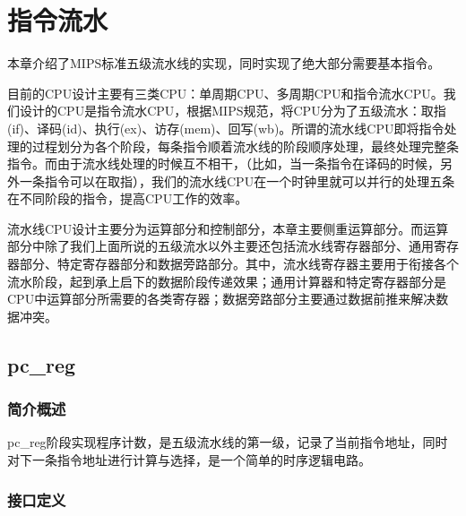 \chapter{指令流水}

本章介绍了MIPS标准五级流水线的实现，同时实现了绝大部分需要基本指令。

目前的CPU设计主要有三类CPU：单周期CPU、多周期CPU和指令流水CPU。我们设计的CPU是指令流水CPU，根据MIPS规范，将CPU分为了五级流水：取指(if)、译码(id)、执行(ex)、访存(mem)、回写(wb)。所谓的流水线CPU即将指令处理的过程划分为各个阶段，每条指令顺着流水线的阶段顺序处理，最终处理完整条指令。而由于流水线处理的时候互不相干，（比如，当一条指令在译码的时候，另外一条指令可以在取指），我们的流水线CPU在一个时钟里就可以并行的处理五条在不同阶段的指令，提高CPU工作的效率。

流水线CPU设计主要分为运算部分和控制部分，本章主要侧重运算部分。而运算部分中除了我们上面所说的五级流水以外主要还包括流水线寄存器部分、通用寄存器部分、特定寄存器部分和数据旁路部分。其中，流水线寄存器主要用于衔接各个流水阶段，起到承上启下的数据阶段传递效果；通用计算器和特定寄存器部分是CPU中运算部分所需要的各类寄存器；数据旁路部分主要通过数据前推来解决数据冲突。

\section{pc\_reg}

    \subsection{简介概述}
    pc\_reg阶段实现程序计数，是五级流水线的第一级，记录了当前指令地址，同时对下一条指令地址进行计算与选择，是一个简单的时序逻辑电路。

    \subsection{接口定义}
        
